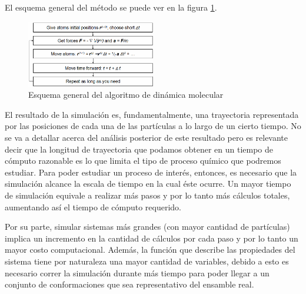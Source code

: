 El esquema general del método se puede ver en la figura \ref{esquemaMD}.


\begin{figure}[!ht]
\begin{center}
\includegraphics[keepaspectratio, width=0.5\textwidth]{img/md/mdalgorithm.png}
\end{center}
\caption{Esquema general del algoritmo de dinámica molecular}
\label{esquemaMD}
\end{figure}






  
El resultado de la simulación es, fundamentalmente, una trayectoria representada por las posiciones de cada una de las partículas a lo largo de un cierto tiempo.
No se va a detallar acerca del análisis posterior de este resultado pero es relevante decir que la longitud de trayectoria que podamos obtener en un tiempo de cómputo razonable es lo que limita el tipo de proceso químico que podremos estudiar.
Para poder estudiar un proceso de interés, entonces, es necesario que la simulación alcance la escala de tiempo en la cual éste ocurre. 
Un mayor tiempo de simulación equivale a realizar más pasos y por lo tanto más cálculos totales, aumentando así el tiempo de cómputo requerido.

Por su parte, simular sistemas más grandes (con mayor cantidad de partículas) implica un incremento en la cantidad de cálculos por cada paso y por lo tanto un mayor costo computacional. 
Además, la función que describe las propiedades del sistema tiene por naturaleza una mayor cantidad de variables, debido a esto es necesario correr la simulación durante más tiempo para poder llegar 
a un conjunto de conformaciones que sea representativo del ensamble real.





